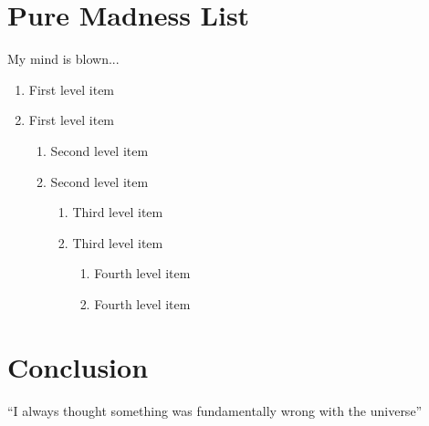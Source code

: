 \documentclass{article}
\begin{document}
\section{Pure Madness List}
My mind is blown...
\begin{enumerate}
   \item First level item
   \item First level item
   \begin{enumerate}
     \item Second level item
     \item Second level item
     \begin{enumerate}
       \item Third level item
       \item Third level item
       \begin{enumerate}
         \item Fourth level item
         \item Fourth level item
       \end{enumerate}
     \end{enumerate}
   \end{enumerate}
 \end{enumerate}

\section{Conclusion}
``I always thought something was fundamentally wrong with the universe'' \citep{adams1995hitchhiker}



\end{document}
